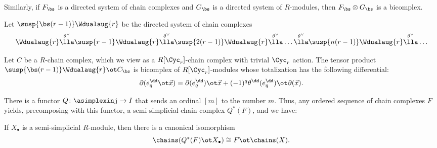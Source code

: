 Similarly, if $F_\bs$ is a directed system of chain complexes and $G_\bs$ is a directed system of $R$-modules, then $F_\bs \otimes G_\bs$ is a bicomplex.

\begin{definition} Let $\susp{\bs(r-1)}\Wdualaug{r}$ be the directed system of chain complexes
\[
	\Wdualaug{r}\overset{\theta^\vee}{\lla }
	\susp{r-1}\Wdualaug{r}\overset{\theta^\vee}{\lla }
	\susp{2(r-1)}\Wdualaug{r} \overset{\theta^\vee}{\lla }
	\ldots
	\overset{\theta^\vee}{\lla }	
	\susp{n(r-1)}\Wdualaug{r} \overset{\theta^\vee}{\lla }
	\ldots
\]
\end{definition}

\begin{example}\label{ex:311}
	Let $C$ be a $R$-chain complex, which we view as a $R[\Cyc_r]$-chain complex with trivial $\Cyc_r$ action.  The tensor product $\susp{\bs(r-1)}\Wdualaug{r} \ot C_\bs$ is bicomplex of $R[\Cyc_r]$-modules whose totalization has the following differential:
	\[
	\partial(e^\dd_{q} \ot \vec{x}) = \partial (e^\dd_{q}) \ot \vec{x} + (-1)^q \theta^\dd(e^\dd_{q}) \ot \partial (\vec{x}).
	\]
\end{example}
There is a functor $Q\colon \asimplexinj\to I$ that sends an ordinal $[m]$ to the number $m$. Thus, any ordered sequence of chain complexes $F$ yields, precomposing with this functor, a semi-simplicial chain complex $Q^*(F)$, and we have:
\begin{lemma} \label{lemma:adj}
	If $X_\bullet$ is a semi-simplicial $R$-module, then there is a canonical isomorphism
\begin{equation}\label{eq:adj}
	\chains(Q^*(F)\ot X_\bullet)\cong F\ot \chains(X). 
\end{equation}
\end{lemma}


